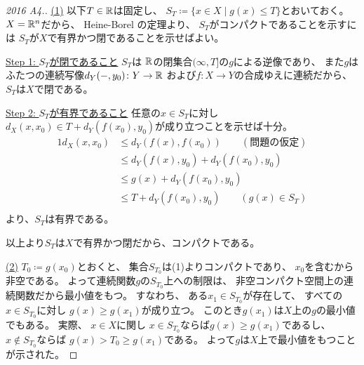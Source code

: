 \documentclass[report]{jlreq}
\begin{document}
\begin{proof}[2016 A4.]
    \uline{(1)} \quad
    以下$T \in \mathbb{R}$は固定し、
    $S_T \coloneqq \{ x \in X \mid g(x) \le T \}$とおいておく。
    $X = \mathbb{R}^n$だから、
    Heine-Borel の定理より、
    $S_T$がコンパクトであることを示すには
    $S_T$が$X$で有界かつ閉であることを示せばよい。

    \uline{Step 1: $S_T$が閉であること} \quad
    $S_T$は
    $\mathbb{R}$の閉集合$(\infty, T]$の$g$による逆像であり、
    また$g$はふたつの連続写像$d_Y({-}, y_0) \colon Y \to \mathbb{R}$
    および$f \colon X \to Y$の合成ゆえに連続だから、
    $S_T$は$X$で閉である。

    \uline{Step 2: $S_T$が有界であること} \quad
    任意の$x \in S_T$に対し
    $d_X(x, x_0) \in T + d_Y(f(x_0), y_0)$が成り立つことを示せば十分。
    \begin{alignat}{1}
        d_X(x, x_0)
            &\le
                d_Y(f(x), f(x_0))
                \qquad
                (\text{問題の仮定})
                \\
            &\le
                d_Y(f(x), y_0)
                    + d_Y(f(x_0), y_0)
                \\
            &\le
                g(x)
                    + d_Y(f(x_0), y_0)
                \\
            &\le
                T
                    + d_Y(f(x_0), y_0)
                \qquad
                (g(x) \in S_T)
                \\
    \end{alignat}
    より、$S_T$は有界である。

    以上より$S_T$は$X$で有界かつ閉だから、コンパクトである。

    \uline{(2)} \quad
    $T_0 \coloneqq g(x_0)$とおくと、
    集合$S_{T_0}$は(1)よりコンパクトであり、
    $x_0$を含むから非空である。
    よって連続関数$g$の$S_{T_0}$上への制限は、
    非空コンパクト空間上の連続関数だから最小値をもつ。
    すなわち、
    ある$x_1 \in S_{T_0}$が存在して、
    すべての$x \in S_{T_0}$に対し
    $g(x) \ge g(x_1)$が成り立つ。
    このとき$g(x_1)$は$X$上の$g$の最小値でもある。
    実際、
    $x \in X$に関し
    $x \in S_{T_0}$ならば$g(x) \ge g(x_1)$であるし、
    $x \not\in S_{T_0}$ならば
    $g(x) > T_0 \ge g(x_1)$である。
    よって$g$は$X$上で最小値をもつことが示された。
\end{proof}
\end{document}
